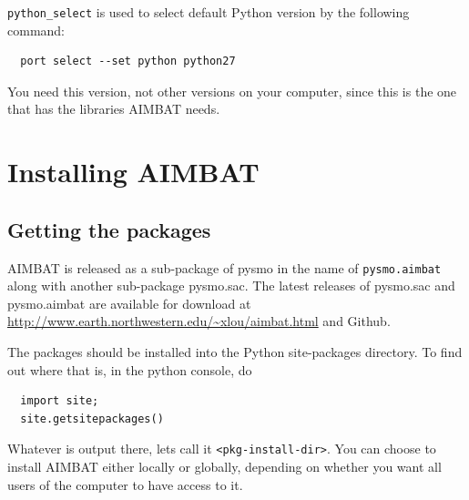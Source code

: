 \documentclass[letterpaper,10pt]{article}
\begin{document}
\verb"python_select" is used to select default Python version by the following command:

\begin{verbatim}
  port select --set python python27
\end{verbatim}

You need this version, not other versions on your computer, since this is the one that has the libraries AIMBAT needs.




\section{Installing AIMBAT}


\subsection{Getting the packages}

AIMBAT is released as a sub-package of pysmo in the name of \verb"pysmo.aimbat" along with
another sub-package pysmo.sac. The latest releases of pysmo.sac and pysmo.aimbat are
available for download at \url{http://www.earth.northwestern.edu/~xlou/aimbat.html} and Github. 

The packages should be installed into the Python site-packages directory. To find out where that is, in the python console, do

\begin{verbatim}
  import site;
  site.getsitepackages()
\end{verbatim}

Whatever is output there, lets call it \verb"<pkg-install-dir>". You can choose to install AIMBAT either locally or globally, depending on whether you want all users of the computer to have access to it.
\end{document}
